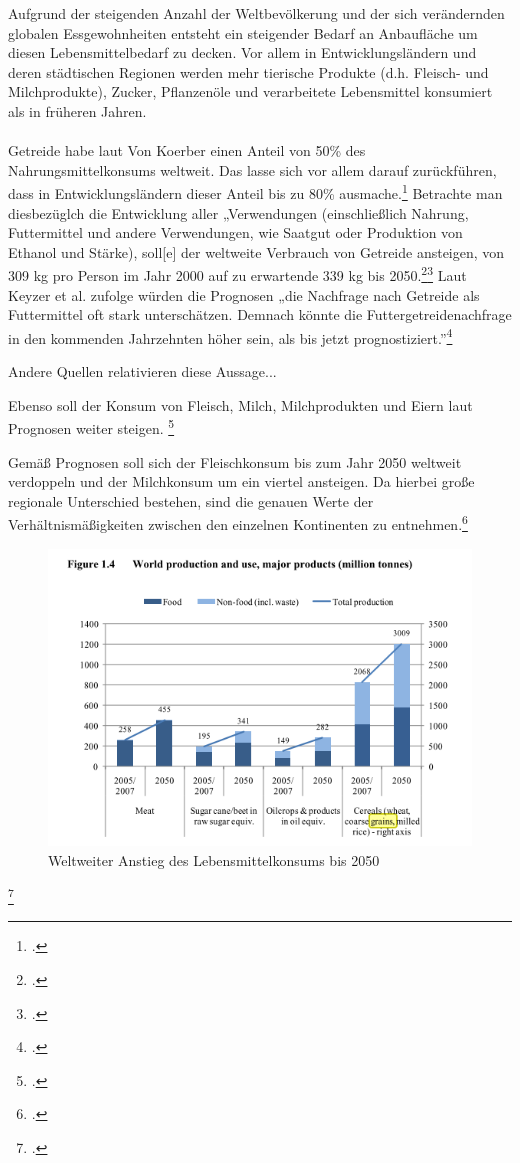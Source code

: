 \documentclass{scrartcl}
\begin{document}
Aufgrund der steigenden Anzahl der Weltbevölkerung und der sich verändernden globalen Essgewohnheiten entsteht ein steigender Bedarf an Anbaufläche um diesen Lebensmittelbedarf zu decken. Vor allem in Entwicklungsländern und deren städtischen Regionen werden mehr tierische Produkte (d.h. Fleisch- und Milchprodukte), Zucker, Pflanzenöle und verarbeitete Lebensmittel konsumiert als in früheren Jahren. \\
\\Getreide habe laut Von Koerber einen Anteil von 50\% des Nahrungsmittelkonsums weltweit. Das lasse sich vor allem darauf zurückführen, dass in Entwicklungsländern dieser Anteil bis zu 80\% ausmache.\footcite[Vgl.][S.4ff]{VonKoerber2008Globale-trends}
Betrachte man diesbezüglch die Entwicklung aller „Verwendungen (einschließlich Nahrung, Futtermittel und andere Verwendungen, wie Saatgut oder Produktion von Ethanol und Stärke), soll[e] der weltweite Verbrauch von Getreide ansteigen, von 309 kg pro Person im Jahr 2000 auf zu erwartende 339 kg bis 2050.\footcite[S.3ff]{VonKoerber2008Globale-trends}\footcite[vgl.][S.23ff]{FAO2006World2030/2050} 
Laut Keyzer et al. zufolge würden die Prognosen „die Nachfrage nach Getreide als Futtermittel oft stark unterschätzen.
Demnach könnte die Futtergetreidenachfrage in den kommenden Jahrzehnten höher sein, als bis jetzt prognostiziert.”\footcite[S.3f]{VonKoerber2008Globale-trends}

Andere Quellen relativieren diese Aussage...

Ebenso soll der Konsum von Fleisch, Milch, Milchprodukten und Eiern laut Prognosen weiter steigen. \footcite[Vgl.][S.4f]{VonKoerber2008Globale-trends}

Gemäß Prognosen soll sich der Fleischkonsum bis zum Jahr 2050 weltweit verdoppeln und der Milchkonsum um ein viertel ansteigen. Da hierbei große regionale Unterschied bestehen, sind die genauen Werte der Verhältnismäßigkeiten zwischen den einzelnen Kontinenten \label{fig:konsumweltweit} zu entnehmen.\footcite[Vgl.][S.4]{VonKoerber2008Globale-trends}

\begin{figure}[htbp]
\centering
\includegraphics[width=16cm]{image_folder/2030S8.png}
\caption{Weltweiter Anstieg des Lebensmittelkonsums bis 2050}
\label{fig:konsumbis2050}
\end{figure}\footcite[vgl.][S.8]{FAO2006World2030/2050} 
\end{document}

